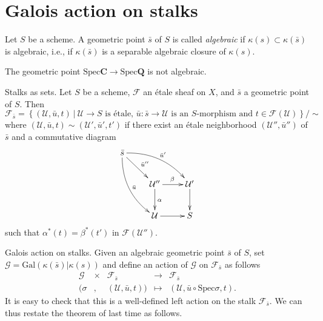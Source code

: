 \section{Galois action on stalks}
\label{section-galois-action-stalks}

\begin{definition}
\label{definition-algebraic-geometric-point}
Let $S$ be a scheme. A geometric point $\bar s$ of $S$ is called
{\it algebraic} if $\kappa(s) \subset \kappa(\bar s)$ is
algebraic, i.e., if $\kappa(\bar s)$ is a separable algebraic
closure of $\kappa(s)$.
\end{definition}

\begin{example}
\label{example-stupid}
The geometric point $\text{Spec} \mathbf{C} \to \text{Spec} \mathbf{Q}$ is not
algebraic.
\end{example}

\noindent
Stalks as sets. Let $S$ be a scheme, $\mathcal{F}$ an
\'etale sheaf on $X$, and $\bar s$ a geometric point of $S$. Then
$$
\mathcal{F}_{\bar s} = \left\{
(\mathcal{U},\bar u, t) \ \big| \ \mathcal{U} \to S \text{ is \'etale, } \bar u
: \bar s \to \mathcal{U} \text{ is an $S$-morphism and } t \in
\mathcal{F}(\mathcal{U})
\right\}
\big/\sim
$$
where $(\mathcal{U},\bar u, t) \sim (\mathcal{U}',\bar u', t')$ if there exist
an \'etale neighborhood $(\mathcal{U}'',\bar u'')$ of $\bar s$ and a
commutative diagram
$$
\xymatrix{
\bar s \ar^{\bar u''}[rd] \ar^{\bar u'}@/^1pc/[rrd] \ar^{\bar u}@/_1pc/[rdd] \\
& \mathcal{U}'' \ar^{\beta}[r] \ar^{\alpha}[d] & \mathcal{U}' \ar[d] \\
& \mathcal{U} \ar[r] & S
}
$$
such that $\alpha^*(t) = \beta^*(t')$ in $\mathcal{F}(\mathcal{U}'')$.

\medskip\noindent
Galois action on stalks.
Given an algebraic geometric point $\bar s$ of $S$, set $\mathcal{G} =
\text{Gal}(\kappa(\bar s) | \kappa(s))$ and define an action of $\mathcal{G}$
on $\mathcal{F}_{\bar s}$ as follows
$$
\begin{matrix}
\mathcal{G} & \times & \mathcal{F}_{\bar s} & \longrightarrow &
\mathcal{F}_{\bar s} \\
(\sigma & , & (\mathcal{U},\bar u, t)) & \longmapsto & (\mathcal{U},\bar u
\circ \text{Spec} \sigma, t).
\end{matrix}
$$
It is easy to check that this is a well-defined left action on the stalk
$\mathcal{F}_{\bar s}$. We can thus restate the theorem of last time as follows.

